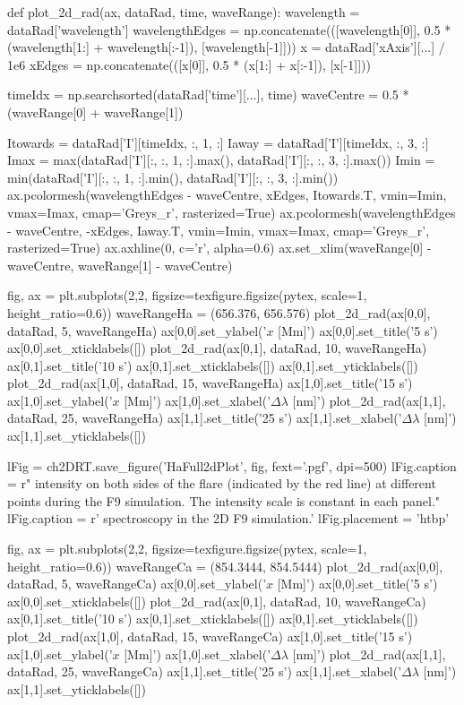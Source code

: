 \begin{pycode}[2DRT]
def plot_2d_rad(ax, dataRad, time, waveRange):
    wavelength = dataRad['wavelength']
    wavelengthEdges = np.concatenate(([wavelength[0]], 0.5 * (wavelength[1:] + wavelength[:-1]), [wavelength[-1]]))
    x = dataRad['xAxis'][...] / 1e6
    xEdges = np.concatenate(([x[0]], 0.5 * (x[1:] + x[:-1]), [x[-1]]))

    timeIdx = np.searchsorted(dataRad['time'][...], time)
    waveCentre = 0.5 * (waveRange[0] + waveRange[1])

    Itowards = dataRad['I'][timeIdx, :, 1, :]
    Iaway = dataRad['I'][timeIdx, :, 3, :]
    Imax = max(dataRad['I'][:, :, 1, :].max(), dataRad['I'][:, :, 3, :].max())
    Imin = min(dataRad['I'][:, :, 1, :].min(), dataRad['I'][:, :, 3, :].min())
    ax.pcolormesh(wavelengthEdges - waveCentre, xEdges, Itowards.T, vmin=Imin, vmax=Imax, cmap='Greys_r', rasterized=True)
    ax.pcolormesh(wavelengthEdges - waveCentre, -xEdges, Iaway.T, vmin=Imin, vmax=Imax, cmap='Greys_r', rasterized=True)
    ax.axhline(0, c='r', alpha=0.6)
    ax.set_xlim(waveRange[0] - waveCentre, waveRange[1] - waveCentre)

fig, ax = plt.subplots(2,2, figsize=texfigure.figsize(pytex, scale=1, height_ratio=0.6))
waveRangeHa = (656.376, 656.576)
plot_2d_rad(ax[0,0], dataRad, 5, waveRangeHa)
ax[0,0].set_ylabel('$x$ [Mm]')
ax[0,0].set_title('5 s')
ax[0,0].set_xticklabels([])
plot_2d_rad(ax[0,1], dataRad, 10, waveRangeHa)
ax[0,1].set_title('10 s')
ax[0,1].set_xticklabels([])
ax[0,1].set_yticklabels([])
plot_2d_rad(ax[1,0], dataRad, 15, waveRangeHa)
ax[1,0].set_title('15 s')
ax[1,0].set_ylabel('$x$ [Mm]')
ax[1,0].set_xlabel('$\Delta\lambda$ [nm]')
plot_2d_rad(ax[1,1], dataRad, 25, waveRangeHa)
ax[1,1].set_title('25 s')
ax[1,1].set_xlabel('$\Delta\lambda$ [nm]')
ax[1,1].set_yticklabels([])

lFig = ch2DRT.save_figure('HaFull2dPlot', fig, fext='.pgf', dpi=500)
lFig.caption = r"\Ha{} intensity on both sides of the flare (indicated by the red line) at different points during the F9 simulation. The intensity scale is constant in each panel."
lFig.caption = r'\Ha{} spectroscopy in the 2D F9 simulation.'
lFig.placement = 'htbp'

fig, ax = plt.subplots(2,2, figsize=texfigure.figsize(pytex, scale=1, height_ratio=0.6))
waveRangeCa = (854.3444, 854.5444)
plot_2d_rad(ax[0,0], dataRad, 5, waveRangeCa)
ax[0,0].set_ylabel('$x$ [Mm]')
ax[0,0].set_title('5 s')
ax[0,0].set_xticklabels([])
plot_2d_rad(ax[0,1], dataRad, 10, waveRangeCa)
ax[0,1].set_title('10 s')
ax[0,1].set_xticklabels([])
ax[0,1].set_yticklabels([])
plot_2d_rad(ax[1,0], dataRad, 15, waveRangeCa)
ax[1,0].set_title('15 s')
ax[1,0].set_ylabel('$x$ [Mm]')
ax[1,0].set_xlabel('$\Delta\lambda$ [nm]')
plot_2d_rad(ax[1,1], dataRad, 25, waveRangeCa)
ax[1,1].set_title('25 s')
ax[1,1].set_xlabel('$\Delta\lambda$ [nm]')
ax[1,1].set_yticklabels([])


\end{pycode}
